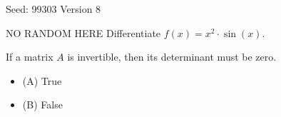 \documentclass[12pt]{exam}
\begin{document}
{\small Seed: 99303 \hfill Version 8}

\vspace{1em}

\begin{questions}


\question NO RANDOM HERE Differentiate $f(x) = x^2 \cdot \sin(x)$.




  \vspace{2\baselineskip}  %






\vspace{1em}

\question If a matrix $A$ is invertible, then its determinant must be zero.




  \begin{itemize}[label={}]
    \item (A) True
    \item (B) False
  \end{itemize}







\vspace{1em}


\end{questions}
\end{document}
